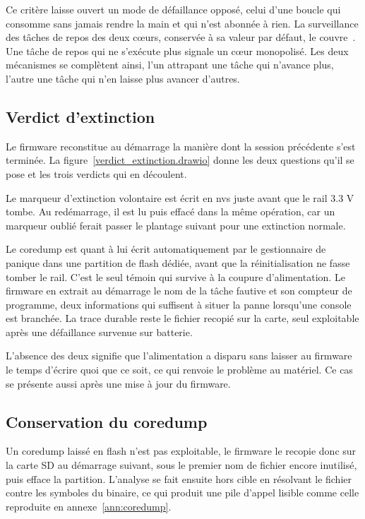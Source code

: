 Ce critère laisse ouvert un mode de défaillance opposé, celui d'une boucle qui consomme sans jamais rendre la main et qui n'est abonnée à rien. La surveillance des tâches de repos des deux cœurs, conservée à sa valeur par défaut, le couvre~\cite{ESP32_IDF_wdt}. Une tâche de repos qui ne s'exécute plus signale un cœur monopolisé. Les deux mécanismes se complètent ainsi, l'un attrapant une tâche qui n'avance plus, l'autre une tâche qui n'en laisse plus avancer d'autres.

\subsection{Verdict d'extinction}
\label{sec:controlled_extinction}

Le firmware reconstitue au démarrage la manière dont la session précédente s'est terminée. La figure~\ref{verdict_extinction.drawio} donne les deux questions qu'il se pose et les trois verdicts qui en découlent.


Le marqueur d'extinction volontaire est écrit en \gls{nvs} juste avant que le rail 3.3 V tombe. Au redémarrage, il est lu puis effacé dans la même opération, car un marqueur oublié ferait passer le plantage suivant pour une extinction normale.

Le \gls{coredump} est quant à lui écrit automatiquement par le gestionnaire de panique dans une partition de flash dédiée, avant que la réinitialisation ne fasse tomber le rail. C'est le seul témoin qui survive à la coupure d'alimentation. Le firmware en extrait au démarrage le nom de la tâche fautive et son compteur de programme, deux informations qui suffisent à situer la panne lorsqu'une console est branchée. La trace durable reste le fichier recopié sur la carte, seul exploitable après une défaillance survenue sur batterie.

L'absence des deux signifie que l'alimentation a disparu sans laisser au firmware le temps d'écrire quoi que ce soit, ce qui renvoie le problème au matériel. Ce cas se présente aussi après une mise à jour du firmware.

\subsection{Conservation du coredump}

Un \gls{coredump} laissé en flash n'est pas exploitable, le firmware le recopie donc sur la carte SD au démarrage suivant, sous le premier nom de fichier encore inutilisé, puis efface la partition. L'analyse se fait ensuite hors cible en résolvant le fichier contre les symboles du binaire, ce qui produit une pile d'appel lisible comme celle reproduite en annexe~\ref{ann:coredump}.


